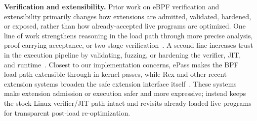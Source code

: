 \noindent\textbf{Verification and extensibility.}
Prior work on eBPF verification and extensibility primarily changes how extensions are admitted, validated, hardened, or exposed, rather than how already-accepted live programs are optimized. One line of work strengthens reasoning in the load path through more precise analysis, proof-carrying acceptance, or two-stage verification~\cite{gershuni2019simple,sun2024validating,wu2025vep,bcf,vishwanathan2023verifying}.
%
A second line increases trust in the execution pipeline by validating, fuzzing, or hardening the verifier, JIT, and runtime~\cite{nelson2020specification,wang2014jitk,lyu2025ebpf,peng2024toss,gerhorst2024verifence,lim2023unleashing,soo2024safebpf,jin2024beebox}.
%
Closest to our implementation concerns, ePass makes the BPF load path extensible through in-kernel passes, while Rex and other recent extension systems broaden the safe extension interface itself~\cite{epass,jia2025rex,dwivedi2024fast,zheng2025extending}. 
%
These systems make extension admission or execution safer and more expressive; \tool instead keeps the stock Linux verifier/JIT path intact and revisits already-loaded live programs for transparent post-load re-optimization.

